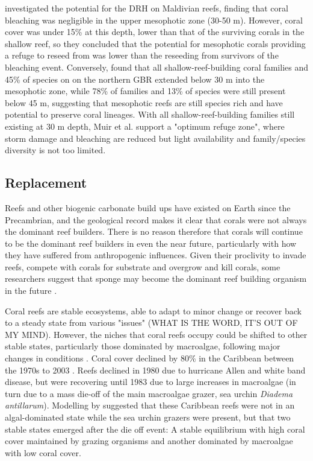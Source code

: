 \documentclass[11pt,a4paper]{article}
\begin{document}
\cite{Montefalcone2020} investigated the potential for the DRH on Maldivian reefs, finding that coral bleaching was negligible in the upper mesophotic zone (30-50 m). However, coral cover was under 15\% at this depth, lower than that of the surviving corals in the shallow reef, so they concluded that the potential for mesophotic corals providing a refuge to reseed from was lower than the reseeding from survivors of the bleaching event. Conversely, \cite{Muir2018} found that all shallow-reef-building coral families and 45\% of species on on the northern GBR extended below 30 m into the mesophotic zone, while 78\% of families and 13\% of species were still present below 45 m, suggesting that mesophotic reefs are still species rich and have potential to preserve coral lineages. With all shallow-reef-building families still existing at 30 m depth, Muir et al. support a "optimum refuge zone", where storm damage and bleaching are reduced but light availability and family/species diversity is not too limited.



\subsection{Replacement}

Reefs and other biogenic carbonate build ups have existed on Earth since the Precambrian, and the geological record makes it clear that corals were not always the dominant reef builders. There is no reason therefore that corals will continue to be the dominant reef builders in even the near future, particularly with how they have suffered from anthropogenic influences. 
Given their proclivity to invade reefs, compete with corals for substrate and overgrow and kill corals, some researchers suggest that sponge may become the dominant reef building organism in the future \citep{Bell2013}. %

Coral reefs are stable ecosystems, able to adapt to minor change or recover back to a steady state from various "issues" (WHAT IS THE WORD, IT'S OUT OF MY MIND). However, the niches that coral reefs occupy could be shifted to other stable states, particularly those dominated by macroalgae, following major changes in conditions \cite{Knowlton1992}. Coral cover declined by 80\% in the Caribbean between the 1970s to 2003 \citep{Gardner2003}. Reefs declined  in 1980 due to hurricane Allen and white band disease, but were recovering until 1983 due to large increases in macroalgae (in turn due to a mass die-off of the main macroalgae grazer, sea urchin \textit{Diadema antillarum}). Modelling by \cite{Mumby2007} suggested that these Caribbean reefs were not in an algal-dominated state while the sea urchin grazers were present, but that two stable states emerged after the die off event: A stable equilibrium with high coral cover maintained by grazing organisms and another dominated by macroalgae with low coral cover. 
\end{document}

